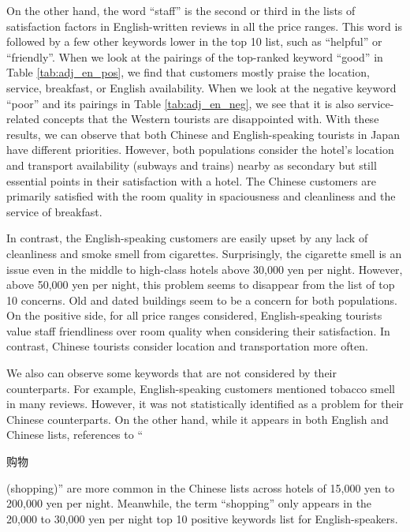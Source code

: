 \documentclass[smallextended,natbib]{svjour3}       %
\begin{document}
    On the other hand, the word ``staff'' is the second or third in the lists of satisfaction factors in English-written reviews in all the price ranges. This word is followed by a few other keywords lower in the top 10 list, such as ``helpful'' or ``friendly''. When we look at the pairings of the top-ranked keyword ``good'' in Table \ref{tab:adj_en_pos}, we find that customers mostly praise the location, service, breakfast, or English availability. When we look at the negative keyword ``poor'' and its pairings in Table \ref{tab:adj_en_neg}, we see that it is also service-related concepts that the Western tourists are disappointed with. With these results, we can observe that both Chinese and English-speaking tourists in Japan have different priorities. However, both populations consider the hotel's location and transport availability (subways and trains) nearby as secondary but still essential points in their satisfaction with a hotel. The Chinese customers are primarily satisfied with the room quality in spaciousness and cleanliness and the service of breakfast.

    In contrast, the English-speaking customers are easily upset by any lack of cleanliness and smoke smell from cigarettes. Surprisingly, the cigarette smell is an issue even in the middle to high-class hotels above 30,000 yen per night. However, above 50,000 yen per night, this problem seems to disappear from the list of top 10 concerns. Old and dated buildings seem to be a concern for both populations. On the positive side, for all price ranges considered, English-speaking tourists value staff friendliness over room quality when considering their satisfaction. In contrast, Chinese tourists consider location and transportation more often.

    We also can observe some keywords that are not considered by their counterparts. For example, English-speaking customers mentioned tobacco smell in many reviews. However, it was not statistically identified as a problem for their Chinese counterparts. On the other hand, while it appears in both English and Chinese lists, references to ``\begin{CJK}{UTF8}{gbsn}购物\end{CJK} (shopping)'' are more common in the Chinese lists across hotels of 15,000 yen to 200,000 yen per night. Meanwhile, the term ``shopping'' only appears in the 20,000 to 30,000 yen per night top 10 positive keywords list for English-speakers.
\end{document}
